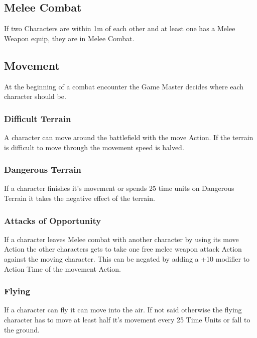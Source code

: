 \documentclass[a4paper,12pt,oneside]{book}
\begin{document}
            \subsection{Melee Combat}
                If two Characters are within 1m of each other and at least one has a Melee Weapon equip, they are in Melee Combat.

            \hypertarget{Movement}{\subsection{Movement}}
                
                At the beginning of a combat encounter the Game Master decides where each character should be.

                \subsubsection{Difficult Terrain}
                A character can move around the battlefield with the move Action. If the terrain is difficult to move through the movement speed is halved.

                \subsubsection{Dangerous Terrain}
                If a character finishes it's movement or spends 25 time units on Dangerous Terrain it takes the negative effect of the terrain.

                \subsubsection{Attacks of Opportunity}
                If a character leaves Melee combat with another character by using its move Action the other characters gets to take one free melee weapon attack Action against the moving character. This can be negated by adding a +10 modifier to Action Time of the movement Action.

                \subsubsection{Flying}
                If a character can fly it can move into the air. If not said otherwise the flying character has to move at least half it's movement every 25 Time Units or fall to the ground.
\end{document}
